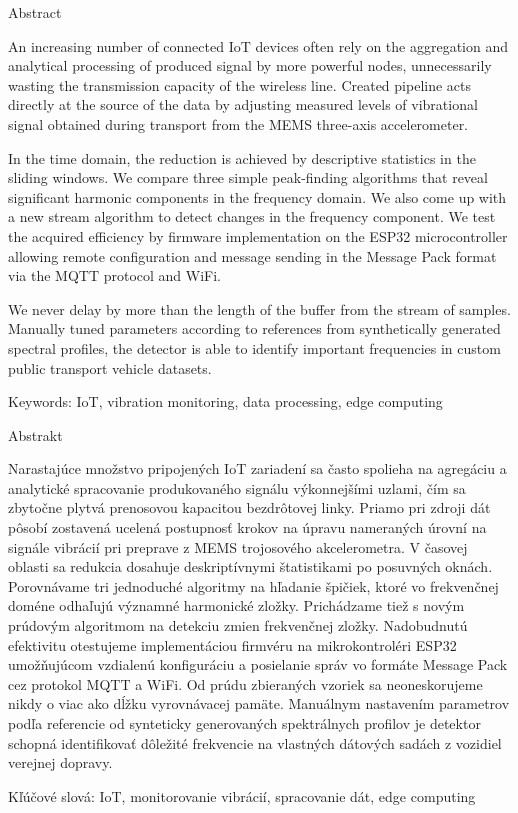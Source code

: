 Abstract

An increasing number of connected IoT devices often rely on the aggregation and analytical processing of produced
signal by more powerful nodes, unnecessarily wasting the transmission capacity of the wireless line.
Created pipeline acts directly at the source of the data by adjusting measured levels of vibrational signal
obtained during transport from the MEMS three-axis accelerometer.

In the time domain, the reduction is achieved by descriptive statistics in the sliding windows. We compare three 
simple peak-finding algorithms that reveal significant harmonic components in the frequency domain. We also come up 
with a new stream algorithm to detect changes in the frequency component. We test the acquired efficiency by
firmware implementation on the ESP32 microcontroller allowing remote configuration and message sending in the Message Pack format 
via the MQTT protocol and WiFi. 

We never delay by more than the length of the buffer from the stream of samples. Manually tuned
parameters according to references from synthetically generated spectral profiles, the detector is able to identify
important frequencies in custom public transport vehicle datasets.

Keywords: IoT, vibration monitoring, data processing, edge computing


Abstrakt

Narastajúce množstvo pripojených IoT zariadení sa často spolieha na agregáciu a analytické spracovanie produkovaného
signálu výkonnejšími uzlami, čím sa zbytočne plytvá prenosovou kapacitou bezdrôtovej linky. Priamo pri zdroji dát pôsobí 
zostavená ucelená postupnosť krokov na úpravu nameraných úrovní na signále vibrácií pri preprave z MEMS trojosového akcelerometra.
V časovej oblasti sa redukcia dosahuje deskriptívnymi štatistikami po posuvných oknách. 
Porovnávame tri jednoduché algoritmy na hľadanie špičiek, ktoré vo frekvenčnej doméne odhaľujú významné harmonické zložky. 
Prichádzame tiež s novým prúdovým algoritmom na detekciu zmien frekvenčnej zložky. Nadobudnutú efektivitu otestujeme implementáciou 
firmvéru na mikrokontroléri ESP32 umožňujúcom vzdialenú konfiguráciu a posielanie správ vo formáte Message Pack cez protokol 
MQTT a WiFi. Od prúdu zbieraných vzoriek sa neoneskorujeme nikdy o viac ako dĺžku vyrovnávacej pamäte. Manuálnym nastavením 
parametrov podľa referencie od synteticky generovaných spektrálnych profilov je detektor schopná identifikovať dôležité 
frekvencie na vlastných dátových sadách z vozidiel verejnej dopravy.


Kľúčové slová: IoT, monitorovanie vibrácií, spracovanie dát, edge computing